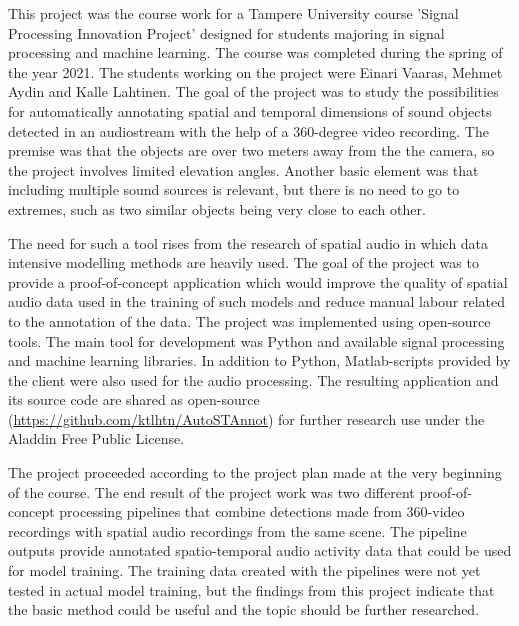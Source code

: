 This project was the course work for a Tampere University course 'Signal Processing Innovation Project' designed for students majoring in signal processing and machine learning. The course was completed during the spring of the year 2021. The students working on the project were Einari Vaaras, Mehmet Aydin and Kalle Lahtinen. The goal of the project was to study the possibilities for automatically annotating spatial and temporal dimensions of sound objects detected in an audiostream with the help of a 360-degree video recording. The premise was that the objects are over two meters away from the the camera, so the project involves limited elevation angles. Another basic element was that including multiple sound sources is relevant, but there is no need to go to extremes, such as two similar objects being very close to each other.

The need for such a tool rises from the research of spatial audio in which data intensive modelling methods are heavily used. The goal of the project was to provide a proof-of-concept application which would improve the quality of spatial audio data used in the training of such models and reduce manual labour related to the annotation of the data. The project was implemented using open-source tools. The main tool for development was Python and available signal processing and machine learning libraries. In addition to Python, Matlab-scripts provided by the client were also used for the audio processing. The resulting application and its source code are shared as open-source (\url{https://github.com/ktlhtn/AutoSTAnnot}) for further research use under the Aladdin Free Public License.

The project proceeded according to the project plan made at the very beginning of the course. The end result of the project work was two different proof-of-concept processing pipelines that combine detections made from 360-video recordings with spatial audio recordings from the same scene. The pipeline outputs provide annotated spatio-temporal audio activity data that could be used for model training. The training data created with the pipelines were not yet tested in actual model training, but the findings from this project indicate that the basic method could be useful and the topic should be further researched.  